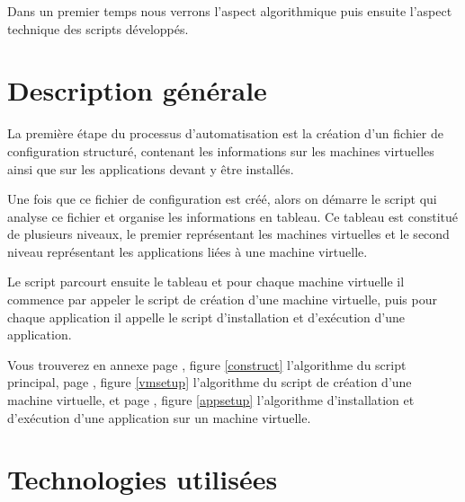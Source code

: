 \documentclass{report}
\begin{document}

    Dans un premier temps nous verrons l'aspect algorithmique puis ensuite l'aspect technique des scripts développés.


    \section{Description générale}

    La première étape du processus d'automatisation est la création d'un fichier de configuration structuré, contenant les informations sur les machines virtuelles ainsi que sur les applications devant y être installés.\bigbreak

    Une fois que ce fichier de configuration est créé, alors on démarre le script qui analyse ce fichier et organise les informations en tableau. Ce tableau est constitué de plusieurs niveaux, le premier représentant les machines virtuelles et le second niveau représentant les applications liées à une machine virtuelle.\bigbreak

    Le script parcourt ensuite le tableau et pour chaque machine virtuelle il commence par appeler le script de création d'une machine virtuelle, puis pour chaque application il appelle le script d'installation et d'exécution d'une application.\bigbreak

    Vous trouverez en annexe page \pageref{construct}, figure \ref{construct} l'algorithme du script principal, page \pageref{vmsetup}, figure \ref{vmsetup} l'algorithme du script de création d'une machine virtuelle, et page \pageref{appsetup}, figure \ref{appsetup} l'algorithme d'installation et d'exécution d'une application sur un machine virtuelle. \bigbreak



    \section{Technologies utilisées}
\end{document}
